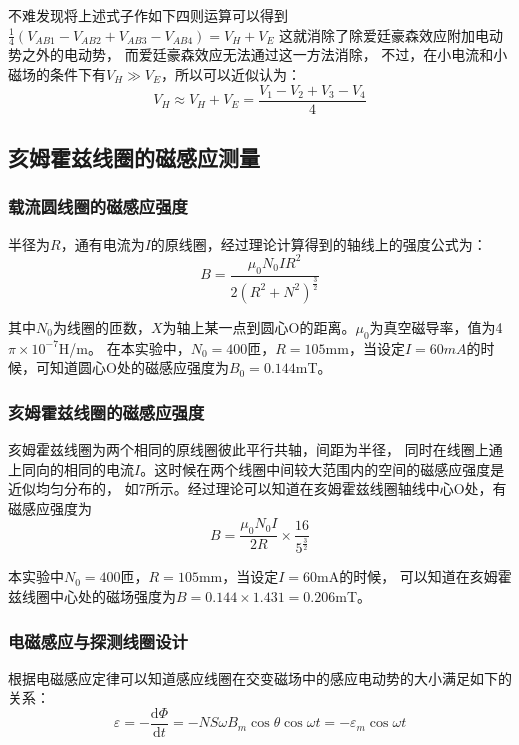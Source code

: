 \documentclass[11pt]{article}
\begin{document}
	不难发现将上述式子作如下四则运算可以得到$\frac{1}{4}(V_{AB1}-V_{AB2}+V_{AB3}-V_{AB4})=V_H+V_E$
	这就消除了除爱廷豪森效应附加电动势之外的电动势，
	而爱廷豪森效应无法通过这一方法消除，
	不过，在小电流和小磁场的条件下有$V_H\gg V_E$，所以可以近似认为：
	\begin{equation*}
		V_H\approx V_H+V_E=\frac{V_1-V_2+V_3-V_4}{4}
	\end{equation*}

	\subsection{亥姆霍兹线圈的磁感应测量}
\subsubsection{载流圆线圈的磁感应强度}
	半径为$R$，通有电流为$I$的原线圈，经过理论计算得到的轴线上的强度公式为：
	\begin{equation*}
		B=\frac{\mu_0N_0IR^2}{2(R^2+N^2)^{\frac{3}{2}}}
	\end{equation*}
	
	其中$N_0$为线圈的匝数，$X$为轴上某一点到圆心O的距离。$\mu_0$为真空磁导率，值为4$\pi\times10^{-7}$H/m。
	在本实验中，$N_0=400$匝，$R=105$mm，当设定$I=60mA$的时候，可知道圆心O处的磁感应强度为$B_0=0.144$mT。

	\subsubsection{亥姆霍兹线圈的磁感应强度}
	亥姆霍兹线圈为两个相同的原线圈彼此平行共轴，间距为半径，
	同时在线圈上通上同向的相同的电流$I$。这时候在两个线圈中间较大范围内的空间的磁感应强度是近似均匀分布的，
	如\figurename7所示。经过理论可以知道在亥姆霍兹线圈轴线中心O处，有磁感应强度为
	\begin{equation*}
		B=\frac{\mu_0N_0I}{2R}\times\frac{16}{5^{\frac{3}{2}}}
	\end{equation*}

	本实验中$N_0=400$匝，$R=105$mm，当设定$I=60$mA的时候，
	可以知道在亥姆霍兹线圈中心处的磁场强度为$B=0.144\times1.431=0.206$mT。

	\subsubsection{电磁感应与探测线圈设计}
	根据电磁感应定律可以知道感应线圈在交变磁场中的感应电动势的大小满足如下的关系：
	\begin{equation*}
		\varepsilon=-\frac{\mathrm{d}\Phi}{\mathrm{d}t}=-NS\omega B_m\cos\theta\cos\omega t=-\varepsilon_m\cos\omega t
	\end{equation*}
\end{document}
